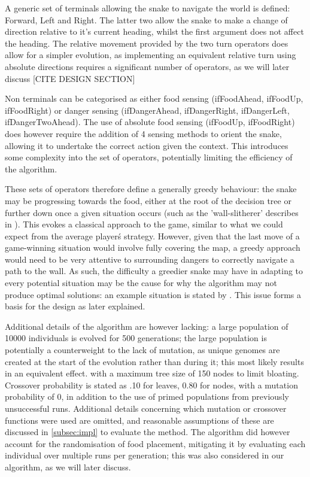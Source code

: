 \documentclass[british,10pt,a4paper]{article}
\begin{document}
A generic set of terminals allowing the snake to navigate the world is defined: Forward, Left and Right. The latter two allow the snake to make a change of direction relative to it's current heading, whilst the first argument does not affect the heading. The relative movement provided by the two turn operators does allow for a simpler evolution, as implementing an equivalent relative turn using absolute directions requires a significant number of operators, as we will later discuss [CITE DESIGN SECTION] \newline

Non terminals can be categorised as either food sensing (ifFoodAhead, ifFoodUp, ifFoodRight) or danger sensing (ifDangerAhead, ifDangerRight, ifDangerLeft, ifDangerTwoAhead). The use of absolute food sensing (ifFoodUp, ifFoodRight) does however require the addition of 4 sensing methods to orient the snake, allowing it to undertake the correct action given the context. This introduces some complexity into the set of operators, potentially limiting the efficiency of the algorithm.\newline

These sets of operators therefore define a generally greedy behaviour: the snake may be progressing towards the food, either at the root of the decision tree or further down once a given situation occurs (such as the 'wall-slitherer' describes in \cite{Ehlis2000-sz}). This evokes a classical approach to the game, similar to what we could expect from the average player\'s strategy. However, given that the last move of a game-winning situation would involve fully covering the map, a greedy approach would need to be very attentive to surrounding dangers to correctly navigate a path to the wall. As such, the difficulty a greedier snake may have in adapting to every potential situation may be the cause for why the algorithm may not produce optimal solutions: an example situation is stated by \citeauthor{Ehlis2000-sz}. This issue forms a basis for the design as later explained. \newline

Additional details of the algorithm are however lacking: a large population of 10000 individuals is evolved for 500 generations; the large population is potentially a counterweight to the lack of mutation, as unique genomes are created at the start of the evolution rather than during it; this most likely results in an equivalent effect. with a maximum tree size of 150 nodes to limit bloating. Crossover probability is stated as .10 for leaves, 0.80 for nodes, with a mutation probability of 0, in addition to the use of primed populations from previously unsuccessful runs. Additional details concerning which mutation or crossover functions were used are omitted, and reasonable assumptions of these are discussed in \autoref{subsec:impl} to evaluate the method. The algorithm did however account for the randomisation of food placement, mitigating it by evaluating each individual over multiple runs per generation; this was also considered in our algorithm, as we will later discuss.\newline
\end{document}
